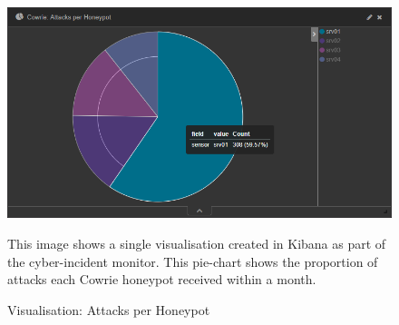 
\begin{figure}[ht]
      \centering
      \includegraphics[width=160mm, scale=1]{Images/Cowrie_Attacks_per_honeypot.PNG}
      \caption{Visualisation: Attacks per Honeypot} 
      \medskip
      \small
		This image shows a single visualisation created in Kibana as part of the cyber-incident monitor. This pie-chart shows the proportion of attacks each Cowrie honeypot received within a month.
\label{fig:Cowrie_Attacks_per_honeypot.PNG}
\end{figure}


